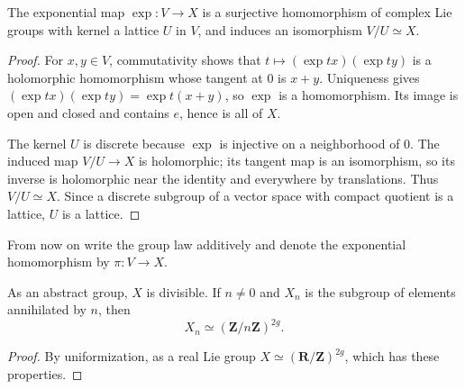 \begin{theorem}[Uniformization]
\label{mumford-frag-uniformization}
The exponential map $\exp:V\to X$ is a surjective homomorphism of complex
Lie groups with kernel a lattice $U$ in $V$, and induces an isomorphism
$V/U\simeq X$.
\leanok
\end{theorem}
\begin{proof}
For $x,y\in V$, commutativity shows that
$t\mapsto(\exp tx)(\exp ty)$ is a holomorphic homomorphism whose tangent at
$0$ is $x+y$.  Uniqueness gives
$(\exp tx)(\exp ty)=\exp t(x+y)$, so $\exp$ is a homomorphism.  Its image is
open and closed and contains $e$, hence is all of $X$.

The kernel $U$ is discrete because $\exp$ is injective on a neighborhood of
$0$.  The induced map $V/U\to X$ is holomorphic; its tangent map is an
isomorphism, so its inverse is holomorphic near the identity and everywhere
by translations.  Thus $V/U\simeq X$.  Since a discrete subgroup of a vector
space with compact quotient is a lattice, $U$ is a lattice.
\end{proof}

From now on write the group law additively and denote the exponential
homomorphism by $\pi:V\to X$.

\begin{proposition}
\label{mumford-frag-torsion}
As an abstract group, $X$ is divisible.  If $n\neq0$ and $X_n$ is the subgroup
of elements annihilated by $n$, then
\[
 X_n\simeq(\mathbf Z/n\mathbf Z)^{2g}.
\]
\leanok
\end{proposition}
\begin{proof}
By uniformization, as a real Lie group $X\simeq(\mathbf R/\mathbf Z)^{2g}$,
which has these properties.
\end{proof}

